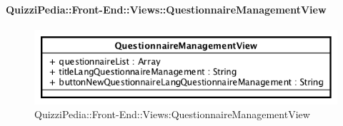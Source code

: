 \paragraph{QuizziPedia::Front-End::Views::QuestionnaireManagementView}
\begin{figure} [ht]
	\centering
	\includegraphics[scale=0.80]{UML/Classi/Front-End/QuizziPedia_Front-end_QuestionnaireManagementView.png}
	\caption{QuizziPedia::Front-End::Views:QuestionnaireManagementView}
\end{figure} \FloatBarrier
